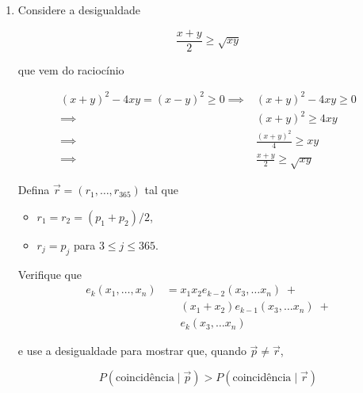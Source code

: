 \documentclass[
  11pt]{report}
\begin{document}
\begin{rmdbox}

\begin{enumerate}
\def\labelenumi{\alph{enumi}.}
\setcounter{enumi}{2}
\item
  Considere a desigualdade

  \[
  \frac{x + y}{2} \geq \sqrt{xy}
  \]

  que vem do raciocínio

  \[
  \begin{aligned}
    (x + y)^2 - 4xy = (x - y)^2 \geq 0
    \implies &
    (x + y)^2 - 4xy \geq 0
    \\
    \implies &
    (x + y)^2 \geq 4xy
    \\
    \implies &
    \frac{(x + y)^2}{4} \geq xy
    \\
    \implies &
    \frac{x + y}{2} \geq \sqrt{xy}
  \end{aligned}
  \]

  Defina $\vec r = (r_1, \ldots, r_{365})$ tal que

  \begin{itemize}
  \item
    $r_1 = r_2 = (p_1 + p_2)/2$,
  \item
    $r_j = p_j$ para $3 \leq j \leq 365$.
  \end{itemize}

  Verifique que
  \[
  \begin{aligned}
    e_k(x_1, \ldots, x_n)
    &=
    x_1 x_2 e_{k-2}(x_3, \ldots x_n) \;+ \\
    &\phantom{{}={}} (x_1 + x_2) e_{k-1}(x_3, \ldots x_n) \;+ \\
    &\phantom{{}={}} e_{k}(x_3, \ldots x_n)
  \end{aligned}
  \]

  e use a desigualdade para mostrar que, quando $\vec p \neq \vec r$,

  \[
  P( \text{coincidência} \mid \vec p) 
  >
  P( \text{coincidência} \mid \vec r)
  \]
\end{enumerate}

\end{rmdbox}
\end{document}
